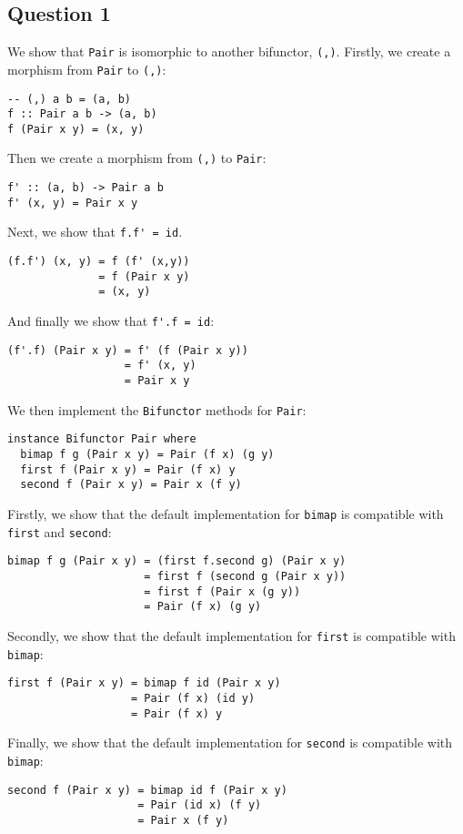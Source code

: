 \subsection*{Question 1}

We show that \lstinline{Pair} is isomorphic to another bifunctor,
\lstinline{(,)}. Firstly, we create a morphism from \lstinline{Pair} to
\lstinline{(,)}:

\begin{lstlisting}
-- (,) a b = (a, b)
f :: Pair a b -> (a, b)
f (Pair x y) = (x, y)
\end{lstlisting}

Then we create a morphism from \lstinline{(,)} to \lstinline{Pair}:

\begin{lstlisting}
f' :: (a, b) -> Pair a b
f' (x, y) = Pair x y
\end{lstlisting}

Next, we show that \lstinline{f.f' = id}.

\begin{lstlisting}
(f.f') (x, y) = f (f' (x,y))
              = f (Pair x y)
              = (x, y)
\end{lstlisting}

And finally we show that \lstinline{f'.f = id}:

\begin{lstlisting}
(f'.f) (Pair x y) = f' (f (Pair x y))
                  = f' (x, y)
                  = Pair x y
\end{lstlisting}

We then implement the \lstinline{Bifunctor} methods for \lstinline{Pair}:

\begin{lstlisting}
instance Bifunctor Pair where
  bimap f g (Pair x y) = Pair (f x) (g y)
  first f (Pair x y) = Pair (f x) y
  second f (Pair x y) = Pair x (f y)
\end{lstlisting}

Firstly, we show that the default implementation for \lstinline{bimap} is
compatible with \lstinline{first} and \lstinline{second}:

\begin{lstlisting}
bimap f g (Pair x y) = (first f.second g) (Pair x y)
                     = first f (second g (Pair x y))
                     = first f (Pair x (g y))
                     = Pair (f x) (g y)
\end{lstlisting}

Secondly, we show that the default implementation for \lstinline{first} is
compatible with \lstinline{bimap}:

\begin{lstlisting}
first f (Pair x y) = bimap f id (Pair x y)
                   = Pair (f x) (id y)
                   = Pair (f x) y
\end{lstlisting}

Finally, we show that the default implementation for \lstinline{second} is
compatible with \lstinline{bimap}:

\begin{lstlisting}
second f (Pair x y) = bimap id f (Pair x y)
                    = Pair (id x) (f y)
                    = Pair x (f y)
\end{lstlisting}
